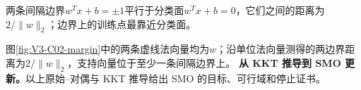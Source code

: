 \documentclass[UTF8,a4paper,11pt,openany]{ctexbook}
\begin{document}
\setcounter{page}{376}
\setcounter{chapter}{18}
\setcounter{figure}{0}
\pagestyle{headings}
\begin{geometrybox}
两条间隔边界$w^Tx+b=\pm1$平行于分类面$w^Tx+b=0$，它们之间的距离为$2/\lVert w\rVert_2$；边界上的训练点最靠近分类面。
\end{geometrybox}

图\ref{fig:V3-C02-margin}中的两条虚线法向量均为$w$；沿单位法向量测得的两边界距离为$2/\lVert w\rVert_2$，支持向量位于至少一条间隔边界上。
\textbf{从 KKT 推导到 SMO 更新。}以上原始--对偶与 KKT 推导给出 SMO 的目标、可行域和停止证书。
\end{document}
